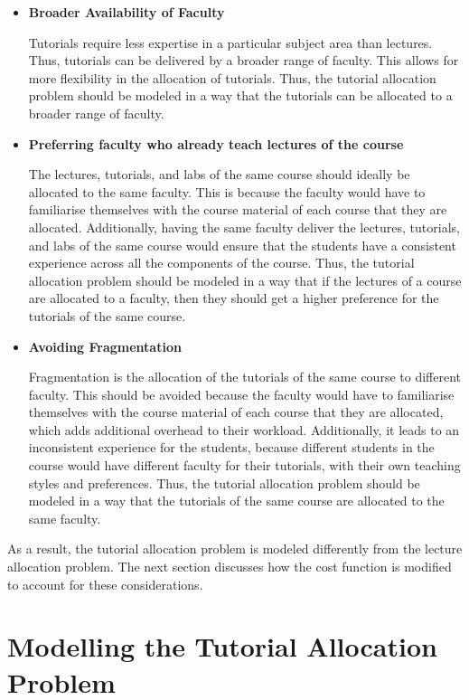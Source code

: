 \begin{itemize}
  \item \textbf{Broader Availability of Faculty}

        Tutorials require less expertise in a particular subject area than lectures. Thus, tutorials can be delivered by a broader range of faculty. This allows for more flexibility in the allocation of tutorials. Thus, the tutorial allocation problem should be modeled in a way that the tutorials can be allocated to a broader range of faculty.

  \item \textbf{Preferring faculty who already teach lectures of the course}

        The lectures, tutorials, and labs of the same course should ideally be allocated to the same faculty. This is because the faculty would have to familiarise themselves with the course material of each course that they are allocated. Additionally, having the same faculty deliver the lectures, tutorials, and labs of the same course would ensure that the students have a consistent experience across all the components of the course. Thus, the tutorial allocation problem should be modeled in a way that if the lectures of a course are allocated to a faculty, then they should get a higher preference for the tutorials of the same course.

  \item \textbf{Avoiding Fragmentation}

        Fragmentation is the allocation of the tutorials of the same course to different faculty. This should be avoided because the faculty would have to familiarise themselves with the course material of each course that they are allocated, which adds additional overhead to their workload. Additionally, it leads to an inconsistent experience for the students, because different students in the course would have different faculty for their tutorials, with their own teaching styles and preferences. Thus, the tutorial allocation problem should be modeled in a way that the tutorials of the same course are allocated to the same faculty.

\end{itemize}

As a result, the tutorial allocation problem is modeled differently from the lecture allocation problem. The next section discusses how the cost function is modified to account for these considerations.


\section{Modelling the Tutorial Allocation Problem}

